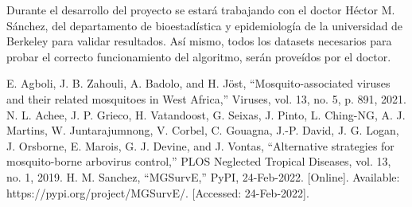 \documentclass[letterpaper, 10pt, conference]{ieeeconf}
\begin{document}
Durante el desarrollo del proyecto se estará trabajando con el doctor Héctor M. Sánchez, del departamento de bioestadística y epidemiología de la universidad de Berkeley para validar resultados. Así mismo, todos los datasets necesarios para probar el correcto funcionamiento del algoritmo, serán proveídos por el doctor.

\begin{thebibliography}{99}
  E. Agboli, J. B. Zahouli, A. Badolo, and H. Jöst, “Mosquito-associated viruses and their related mosquitoes in West Africa,” Viruses, vol. 13, no. 5, p. 891, 2021. 
  N. L. Achee, J. P. Grieco, H. Vatandoost, G. Seixas, J. Pinto, L. Ching-NG, A. J. Martins, W. Juntarajumnong, V. Corbel, C. Gouagna, J.-P. David, J. G. Logan, J. Orsborne, E. Marois, G. J. Devine, and J. Vontas, “Alternative strategies for mosquito-borne arbovirus control,” PLOS Neglected Tropical Diseases, vol. 13, no. 1, 2019. 
  H. M. Sanchez, “MGSurvE,” PyPI, 24-Feb-2022. [Online]. Available: https://pypi.org/project/MGSurvE/. [Accessed: 24-Feb-2022]. 
\end{thebibliography}
\end{document}
